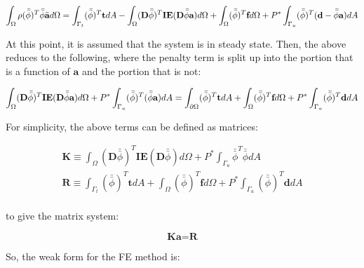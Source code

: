 \documentclass[10pt]{article}
\begin{document}
\begin{equation}
\int_{\Omega}\rho(\bar{\bar{\phi}})^T\bar{\bar{\phi}}\ddot{\textbf{a}}d\Omega=\int_{\Gamma_t}(\bar{\bar{\phi}})^T\textbf{t}dA- \int_{\Omega}(\textbf{D}\bar{\bar{\phi}})^T\textbf{IE}(\textbf{D}\bar{\bar{\phi}}\textbf{a})d\Omega +\int_{\Omega}(\bar{\bar{\phi}})^T\textbf{f}d\Omega+P^{*}\int_{\Gamma_u}(\bar{\bar{\phi}})^T(\textbf{d}-\bar{\bar{\phi}}\textbf{a})dA\\
\end{equation}

At this point, it is assumed that the system is in steady state. Then, the above reduces to the following, where the penalty term is split up into the portion that is a function of \(\textbf{a}\) and the portion that is not:

\begin{equation}
\int_{\Omega}(\textbf{D}\bar{\bar{\phi}})^T\textbf{IE}(\textbf{D}\bar{\bar{\phi}}\textbf{a})d\Omega +P^{*}\int_{\Gamma_u}(\bar{\bar{\phi}})^T(\bar{\bar{\phi}}\textbf{a})dA=\int_{\partial\Omega}(\bar{\bar{\phi}})^T\textbf{t}dA+\int_{\Omega}(\bar{\bar{\phi}})^T\textbf{f}d\Omega+P^{*}\int_{\Gamma_u}(\bar{\bar{\phi}})^T\textbf{d}dA\\
\end{equation}

For simplicity, the above terms can be defined as matrices:

\begin{equation}
\label{eq:FEWeakForm}
\begin{aligned}
\textbf{K}\equiv\int_{\Omega}(\textbf{D}\bar{\bar{\phi}})^T\textbf{IE}(\textbf{D}\bar{\bar{\phi}})d\Omega +P^{*}\int_{\Gamma_u}\bar{\bar{\phi}}^T\bar{\bar{\phi}}dA\\
\textbf{R}\equiv\int_{\Gamma_t}(\bar{\bar{\phi}})^T\textbf{t}dA+\int_{\Omega}(\bar{\bar{\phi}})^T\textbf{f}d\Omega+P^{*}\int_{\Gamma_u}(\bar{\bar{\phi}})^T\textbf{d}dA\\
\end{aligned}
\end{equation}

to give the matrix system:

\begin{equation}
\textbf{K}\textbf{a}=\textbf{R}
\end{equation}

So, the weak form for the FE method is:
\end{document}

